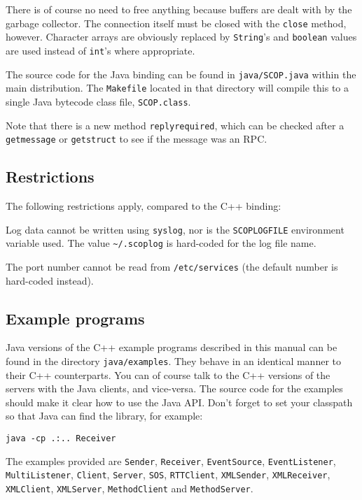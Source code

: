 \documentclass[12pt,a4paper,twoside]{article}
\renewcommand{\_}{\texttt{\symbol{95}}}
\begin{document}
There is of course no need to free anything because buffers
are dealt with by the garbage collector. The connection itself
must be closed with the \texttt{close} method, however.
Character arrays are obviously replaced by \texttt{String}'s
and \texttt{boolean} values are used instead of \texttt{int}'s
where appropriate.

The source code for the Java binding can be found in
\texttt{java/SCOP.java} within the main distribution.
The \texttt{Makefile} located in that directory will
compile this to a single Java bytecode class file,
\texttt{SCOP.class}.

Note that there is a new method \texttt{reply\_required}, which can be
checked after a \texttt{get\_message} or \texttt{get\_struct}
to see if the message was an RPC.

\subsection{Restrictions}

The following restrictions apply, compared to the C++ binding:
\begin{bulletlist}
\item Log data cannot be written using \texttt{syslog}, nor is the
\texttt{SCOP\_LOGFILE} environment variable used. The value
\verb=~/.scoplog= is hard-coded for the log file name.
\item The port number cannot be read from \texttt{/etc/services}
(the default number is hard-coded instead).
\end{bulletlist}

\subsection{Example programs}

Java versions of the C++ example programs described in this manual can
be found in the directory \texttt{java/examples}. They behave in an
identical manner to their C++ counterparts. You can of course talk to
the C++ versions of the servers with the Java clients, and vice-versa.
The source code for the examples should make it clear how to use the
Java API. Don't forget to set your classpath so that Java can find the
library, for example:

\texttt{java -cp .:.. Receiver}

The examples provided are
\texttt{Sender}, \texttt{Receiver},
\texttt{EventSource}, \texttt{EventListener}, \texttt{MultiListener},
\texttt{Client}, \texttt{Server}, \texttt{SOS}, \texttt{RTTClient},
\texttt{XMLSender}, \texttt{XMLReceiver},
\texttt{XMLClient}, \texttt{XMLServer},
\texttt{MethodClient} and \texttt{MethodServer}.
\end{document}
